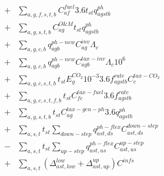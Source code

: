 \documentclass[review]{elsarticle}
\begin{document}
\begin{align} 
+  & \sum_{a,g,f,s,t,b}C^{fuel}_{af} 3.6 t_{st} q^{ph}_{agstb}  
\label{1}\\ 
+  & \sum_{a,g,s,t,b} C^{O\&M}_{ag} t_{st} q^{ph}_{agstb}  
\label{2}\\ 
+  & \sum_{a,g,c,b} q^{ph-new}_{agb} C^{inv}_{ag} \Lambda_c  
\label{3}\\
+  & \sum_{a,g,c,b} q^{ph-new}_{agb} C^{tax-inv}_{agb} \Lambda_c 10^6 
\label{4}\\
+ & \sum_{a,g,c,s,t,b} t_{st} E^{CO_{2}}_g 10^{-3} 3.6 f^{rate}_{agstb} C^{tax-CO_2}_{c} 
\label{5}\\
+ & \sum_{a,g,c,s,t,f,b} t_{st} C^{tax-fuel}_{fc} 3.6 f^{rate}_{agstb} 
\label{6} \\
+ & \sum_{a,g,s,t,b} t_{st} C^{tax-gen-ph}_{ag} 3.6 q^{ph}_{agstb}
\label{8}\\
+ & \sum_{a,s,t} t_{st} \sum_{down-step} q^{ph-flex}_{ast,ds} C^{down-step}_{ast,ds} 
\label{9}\\
- & \sum_{a,s,t} t_{st} \sum_{up-step} q^{ph-flex}_{ast,us} C^{up-step}_{ast,us} 
\label{10}\\
+ & \sum_{a,s,t} (\Delta^{low}_{ast,low} + \Delta^{up}_{ast,up}) C^{infs} 
\label{11}
%
\end{align}
\end{document}
